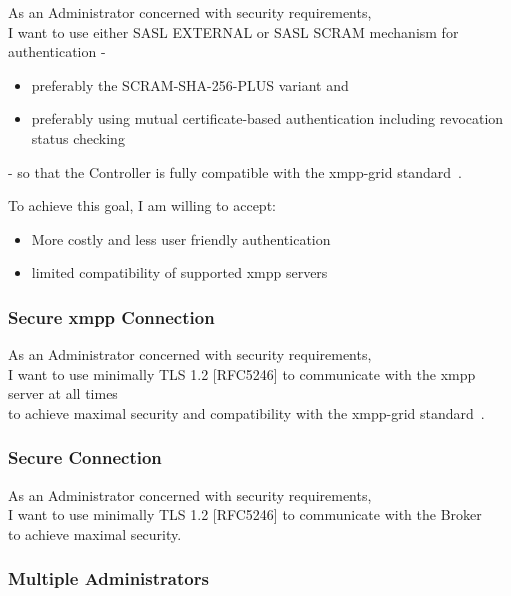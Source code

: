 As an Administrator concerned with security requirements,\\
I want to use either SASL EXTERNAL or SASL SCRAM mechanism for authentication -

\begin{itemize}
    \item preferably the SCRAM-SHA-256-PLUS variant and
    \item preferably using mutual certificate-based authentication including revocation status checking
\end{itemize}

\noindent - so that the Controller is fully compatible with the \gls{xmpp-grid} standard~\cite{ietf-mile-xmpp-grid-05}.

\noindent To achieve this goal, I am willing to accept:
\begin{itemize}
    \item More costly and less user friendly authentication
    \item limited compatibility of supported \gls{xmpp} servers
\end{itemize}

\subsubsection{Secure \gls{xmpp} Connection}

As an Administrator concerned with security requirements,\\
I want to use minimally TLS 1.2 [RFC5246] to communicate with the \gls{xmpp} server at all times\\
to achieve maximal security and compatibility with the \gls{xmpp-grid} standard~\cite{ietf-mile-xmpp-grid-05}.

\subsubsection{Secure Connection}

As an Administrator concerned with security requirements,\\
I want to use minimally TLS 1.2 [RFC5246] to communicate with the Broker\\
to achieve maximal security.

\subsubsection{Multiple Administrators}\label{sec:requirement-multiple-administrators}


